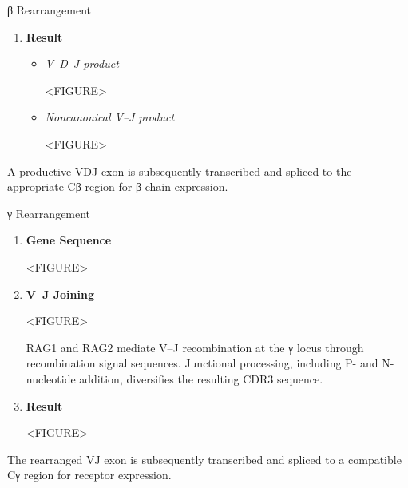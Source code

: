 \begin{core}{β Rearrangement}
\begin{enumerate}[label=(\arabic*)]
\begin{itemize}
            \end{itemize}

          \item \textbf{Result}

            \begin{itemize}

              \item \textit{V--D--J product}

                <FIGURE>

              \item \textit{Noncanonical V--J product}

                <FIGURE>

            \end{itemize}

        \end{enumerate}

        A productive VDJ exon is subsequently transcribed and spliced to the appropriate Cβ region for β-chain expression.

      \end{core}

      \begin{core}{γ Rearrangement}

        \begin{enumerate}[label=(\arabic*)]

          \item \textbf{Gene Sequence}

            <FIGURE>

          \item \textbf{V--J Joining}

            <FIGURE>

            RAG1 and RAG2 mediate V--J recombination at the γ locus through recombination signal sequences. Junctional processing, including P- and N-nucleotide addition, diversifies the resulting CDR3 sequence.

          \item \textbf{Result}

            <FIGURE>

        \end{enumerate}

        The rearranged VJ exon is subsequently transcribed and spliced to a compatible Cγ region for receptor expression.

      \end{core}

